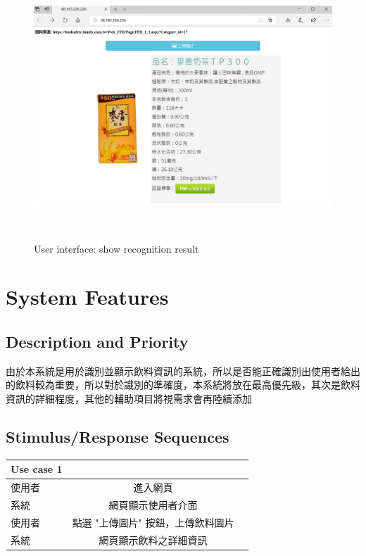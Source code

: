 \documentclass{scrreprt}
\begin{document}
\begin{CJK}{UTF8}{bkai}
\begin{figure}[h]
\begin{center}
\includegraphics[width=14cm,height=10cm]{userinterface2.png}
\end{center}
\caption{User interface: show recognition result}
\label{fig:1}
\end{figure}


\chapter{System Features}

\section{Description and Priority}
由於本系統是用於識別並顯示飲料資訊的系統，所以是否能正確識別出使用者給出的飲料較為重要，所以對於識別的準確度，本系統將放在最高優先級，其次是飲料資訊的詳細程度，其他的輔助項目將視需求會再陸續添加

\section{Stimulus/Response Sequences}
\begin{center}
\begin{tabular}{|l|c|r|}\hline
Use case 1 &\\ \hline
使用者 & 進入網頁\\ \hline
系統 & 網頁顯示使用者介面\\ \hline
使用者 & 點選 "上傳圖片" 按鈕，上傳飲料圖片\\ \hline
系統 & 網頁顯示飲料之詳細資訊\\ \hline
\end{tabular}
\end{center}


\end{CJK}
\end{document}
